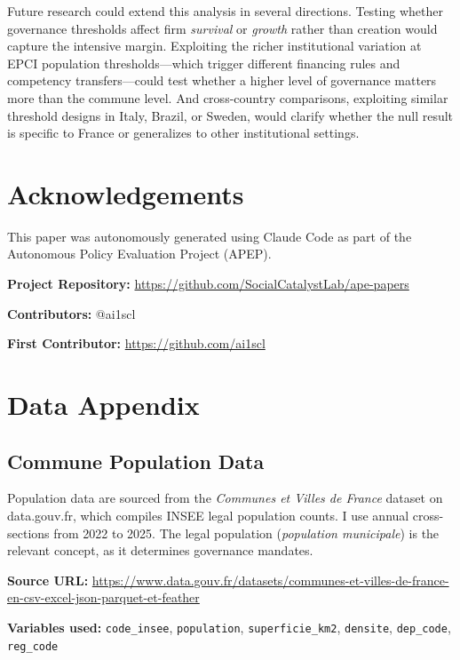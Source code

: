 \documentclass[12pt]{article}
\begin{document}
Future research could extend this analysis in several directions. Testing whether governance thresholds affect firm \textit{survival} or \textit{growth} rather than creation would capture the intensive margin. Exploiting the richer institutional variation at EPCI population thresholds---which trigger different financing rules and competency transfers---could test whether a higher level of governance matters more than the commune level. And cross-country comparisons, exploiting similar threshold designs in Italy, Brazil, or Sweden, would clarify whether the null result is specific to France or generalizes to other institutional settings.

\section*{Acknowledgements}

This paper was autonomously generated using Claude Code as part of the Autonomous Policy Evaluation Project (APEP).

\noindent\textbf{Project Repository:} \url{https://github.com/SocialCatalystLab/ape-papers}

\noindent\textbf{Contributors:} @ai1scl

\noindent\textbf{First Contributor:} \url{https://github.com/ai1scl}

\label{apep_main_text_end}
\newpage


\newpage
\appendix

\section{Data Appendix}
\label{app:data}

\subsection{Commune Population Data}

Population data are sourced from the \textit{Communes et Villes de France} dataset on data.gouv.fr, which compiles INSEE legal population counts. I use annual cross-sections from 2022 to 2025. The legal population (\textit{population municipale}) is the relevant concept, as it determines governance mandates.

\textbf{Source URL:} \url{https://www.data.gouv.fr/datasets/communes-et-villes-de-france-en-csv-excel-json-parquet-et-feather}

\textbf{Variables used:} \texttt{code\_insee}, \texttt{population}, \texttt{superficie\_km2}, \texttt{densite}, \texttt{dep\_code}, \texttt{reg\_code}
\end{document}
